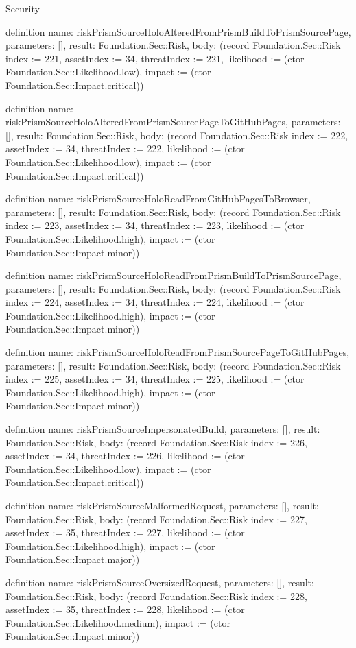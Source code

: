 \begin{lexlean}{Security}
\begin{semanticmodule}
definition{
  name: riskPrismSourceHoloAlteredFromPrismBuildToPrismSourcePage,
  parameters: [],
  result: Foundation.Sec::Risk,
  body: (record Foundation.Sec::Risk {index := 221, assetIndex := 34, threatIndex := 221, likelihood := (ctor Foundation.Sec::Likelihood.low), impact := (ctor Foundation.Sec::Impact.critical)})
}

definition{
  name: riskPrismSourceHoloAlteredFromPrismSourcePageToGitHubPages,
  parameters: [],
  result: Foundation.Sec::Risk,
  body: (record Foundation.Sec::Risk {index := 222, assetIndex := 34, threatIndex := 222, likelihood := (ctor Foundation.Sec::Likelihood.low), impact := (ctor Foundation.Sec::Impact.critical)})
}

definition{
  name: riskPrismSourceHoloReadFromGitHubPagesToBrowser,
  parameters: [],
  result: Foundation.Sec::Risk,
  body: (record Foundation.Sec::Risk {index := 223, assetIndex := 34, threatIndex := 223, likelihood := (ctor Foundation.Sec::Likelihood.high), impact := (ctor Foundation.Sec::Impact.minor)})
}

definition{
  name: riskPrismSourceHoloReadFromPrismBuildToPrismSourcePage,
  parameters: [],
  result: Foundation.Sec::Risk,
  body: (record Foundation.Sec::Risk {index := 224, assetIndex := 34, threatIndex := 224, likelihood := (ctor Foundation.Sec::Likelihood.high), impact := (ctor Foundation.Sec::Impact.minor)})
}

definition{
  name: riskPrismSourceHoloReadFromPrismSourcePageToGitHubPages,
  parameters: [],
  result: Foundation.Sec::Risk,
  body: (record Foundation.Sec::Risk {index := 225, assetIndex := 34, threatIndex := 225, likelihood := (ctor Foundation.Sec::Likelihood.high), impact := (ctor Foundation.Sec::Impact.minor)})
}

definition{
  name: riskPrismSourceImpersonatedBuild,
  parameters: [],
  result: Foundation.Sec::Risk,
  body: (record Foundation.Sec::Risk {index := 226, assetIndex := 34, threatIndex := 226, likelihood := (ctor Foundation.Sec::Likelihood.low), impact := (ctor Foundation.Sec::Impact.critical)})
}

definition{
  name: riskPrismSourceMalformedRequest,
  parameters: [],
  result: Foundation.Sec::Risk,
  body: (record Foundation.Sec::Risk {index := 227, assetIndex := 35, threatIndex := 227, likelihood := (ctor Foundation.Sec::Likelihood.high), impact := (ctor Foundation.Sec::Impact.major)})
}

definition{
  name: riskPrismSourceOversizedRequest,
  parameters: [],
  result: Foundation.Sec::Risk,
  body: (record Foundation.Sec::Risk {index := 228, assetIndex := 35, threatIndex := 228, likelihood := (ctor Foundation.Sec::Likelihood.medium), impact := (ctor Foundation.Sec::Impact.minor)})
}


\end{semanticmodule}
\end{lexlean}
